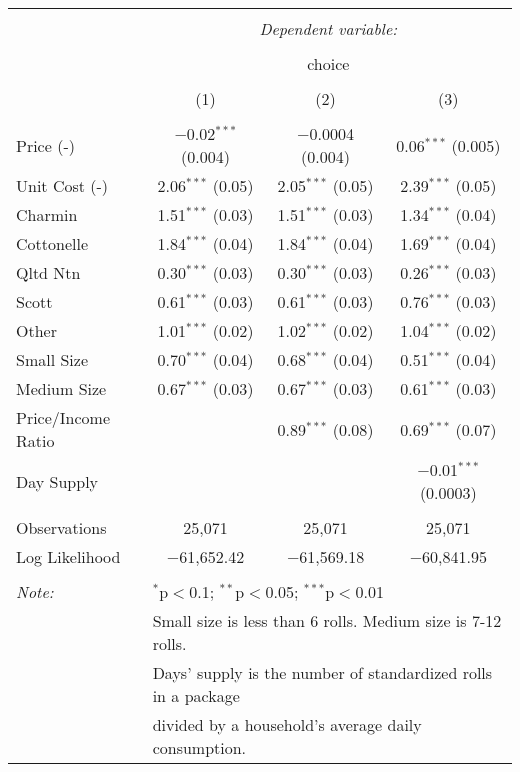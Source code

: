 
\begin{table}[!htbp] \centering 
  \caption{} 
  \label{tab:mnlPhillyBaseline} 
\begin{tabular}{@{\extracolsep{5pt}}lccc} 
\\[-1.8ex]\hline 
\hline \\[-1.8ex] 
 & \multicolumn{3}{c}{\textit{Dependent variable:}} \\ 
\cline{2-4} 
\\[-1.8ex] & \multicolumn{3}{c}{choice} \\ 
\\[-1.8ex] & (1) & (2) & (3)\\ 
\hline \\[-1.8ex] 
 Price (-) & $-$0.02$^{***}$ (0.004) & $-$0.0004 (0.004) & 0.06$^{***}$ (0.005) \\ 
  Unit Cost (-) & 2.06$^{***}$ (0.05) & 2.05$^{***}$ (0.05) & 2.39$^{***}$ (0.05) \\ 
  Charmin & 1.51$^{***}$ (0.03) & 1.51$^{***}$ (0.03) & 1.34$^{***}$ (0.04) \\ 
  Cottonelle & 1.84$^{***}$ (0.04) & 1.84$^{***}$ (0.04) & 1.69$^{***}$ (0.04) \\ 
  Qltd Ntn & 0.30$^{***}$ (0.03) & 0.30$^{***}$ (0.03) & 0.26$^{***}$ (0.03) \\ 
  Scott & 0.61$^{***}$ (0.03) & 0.61$^{***}$ (0.03) & 0.76$^{***}$ (0.03) \\ 
  Other & 1.01$^{***}$ (0.02) & 1.02$^{***}$ (0.02) & 1.04$^{***}$ (0.02) \\ 
  Small Size & 0.70$^{***}$ (0.04) & 0.68$^{***}$ (0.04) & 0.51$^{***}$ (0.04) \\ 
  Medium Size & 0.67$^{***}$ (0.03) & 0.67$^{***}$ (0.03) & 0.61$^{***}$ (0.03) \\ 
  Price/Income Ratio &  & 0.89$^{***}$ (0.08) & 0.69$^{***}$ (0.07) \\ 
  Day Supply &  &  & $-$0.01$^{***}$ (0.0003) \\ 
 \hline \\[-1.8ex] 
Observations & 25,071 & 25,071 & 25,071 \\ 
Log Likelihood & $-$61,652.42 & $-$61,569.18 & $-$60,841.95 \\ 
\hline 
\hline \\[-1.8ex] 
\textit{Note:}  & \multicolumn{3}{l}{$^{*}$p$<$0.1; $^{**}$p$<$0.05; $^{***}$p$<$0.01} \\ 
 & \multicolumn{3}{l}{Small size is less than 6 rolls. Medium size is 7-12 rolls. } \\ 
 & \multicolumn{3}{l}{Days' supply is the number of standardized rolls in a package} \\ 
 & \multicolumn{3}{l}{divided by a household's average daily consumption.} \\ 
\end{tabular} 
\end{table} 
